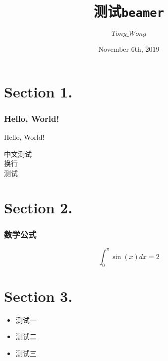 \documentclass[UTF8]{beamer}
\title{测试\texttt{beamer}}
\author{$Tony\_Wong$}
\institute{JLYZ OI team}
\date{November 6th, 2019}
\begin{document}
    \frame{\titlepage}

	\section{Section 1.}
    \begin{frame}
        \frametitle{Hello, World!}
        Hello, World!
    \end{frame}
	\begin{frame}
		中文测试\\
		换行\\ \pause
		测试
	\end{frame}

	\section{Section 2.}
	\begin{frame}
		\frametitle{数学公式}
		$$\int_0^\pi{\sin(x) dx}=2$$
	\end{frame}

	\section{Section 3.}
	\begin{frame}
		\begin{itemize}
			\item<1-> 测试一
			\item<2-> 测试二
			\item<3-> 测试三
		\end{itemize}
	\end{frame}
\end{document}
